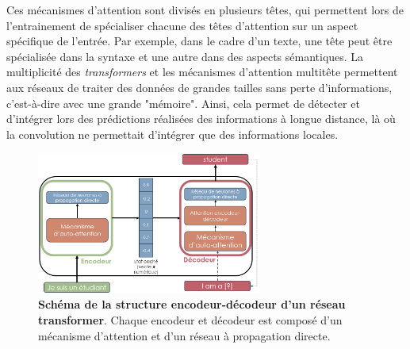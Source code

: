 Ces mécanismes d'attention sont divisés en plusieurs têtes, qui permettent lors de l'entrainement de spécialiser chacune des têtes d'attention sur un aspect spécifique de l'entrée. Par exemple, dans le cadre d'un texte, une tête peut être spécialisée dans la syntaxe et une autre dans des aspects sémantiques. 
La multiplicité des \textit{transformers} et les mécanismes d'attention multitête permettent aux réseaux de traiter des données de grandes tailles sans perte d'informations, c'est-à-dire avec une grande "mémoire". Ainsi, cela permet de détecter et d'intégrer lors des prédictions réalisées des informations à longue distance, là où la convolution ne permettait d'intégrer que des informations locales.

\begin{figure}[!ht]
 \centering
 \includegraphics[width=0.66\textwidth]{figures/encoder_attention.png}
 \caption[Schéma de la structure encodeur-décodeur d'un réseau transformer]{\textbf{Schéma de la structure encodeur-décodeur d'un réseau transformer}. Chaque encodeur et décodeur est composé d'un mécanisme d'attention et d'un réseau à propagation directe.}
 \label{fig:encoder_attention}
\end{figure}

